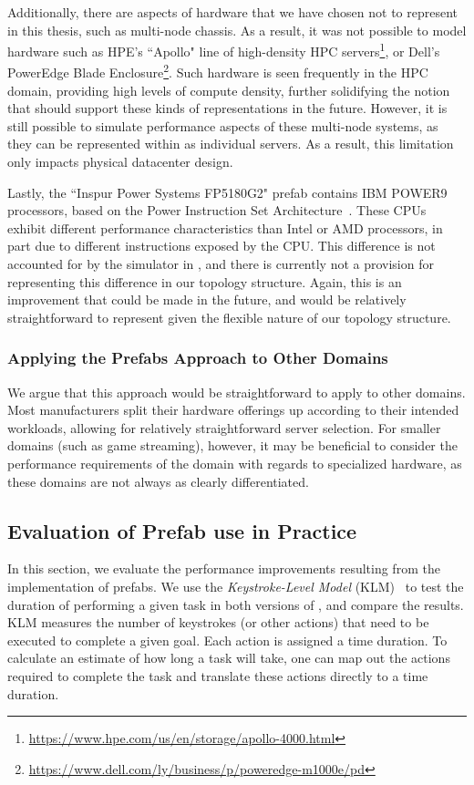 \documentclass[11pt]{article}
\begin{document}
			Additionally, there are aspects of hardware that we have chosen not to represent in this thesis, such as multi-node chassis.
			As a result, it was not possible to model hardware such as HPE's ``Apollo" line of high-density HPC servers\footnote{\url{https://www.hpe.com/us/en/storage/apollo-4000.html}}, or Dell's PowerEdge Blade Enclosure\footnote{\url{https://www.dell.com/ly/business/p/poweredge-m1000e/pd}}.
			Such hardware is seen frequently in the HPC domain, providing high levels of compute density, further solidifying the notion that \opendc{} should support these kinds of representations in the future.
			However, it is still possible to simulate performance aspects of these multi-node systems, as they can be represented within \opendc{} as individual servers.
			As a result, this limitation only impacts physical datacenter design.

			Lastly, the ``Inspur Power Systems FP5180G2" prefab contains IBM POWER9 processors, based on the Power Instruction Set Architecture~\cite{IBM2017}.
			These CPUs exhibit different performance characteristics than Intel or AMD processors, in part due to different instructions exposed by the CPU.
			This difference is not accounted for by the simulator in \opendc{}, and there is currently not a provision for representing this difference in our topology structure.
			Again, this is an improvement that could be made in the future, and would be relatively straightforward to represent given the flexible nature of our topology structure.


		\subsubsection{Applying the Prefabs Approach to Other Domains}
			We argue that this approach would be straightforward to apply to other domains.
			Most manufacturers split their hardware offerings up according to their intended workloads, allowing for relatively straightforward server selection.
			For smaller domains (such as game streaming), however, it may be beneficial to consider the performance requirements of the domain with regards to specialized hardware, as these domains are not always as clearly differentiated.

	\subsection{Evaluation of Prefab use in Practice}
		In this section, we evaluate the performance improvements resulting from the implementation of prefabs.
		We use the \textit{Keystroke-Level Model} (KLM)~\cite{Newell1980} to test the duration of performing a given task in both versions of \opendc{}, and compare the results.
		KLM measures the number of keystrokes (or other actions) that need to be executed to complete a given goal. 
		Each action is assigned a time duration.
		To calculate an estimate of how long a task will take, one can map out the actions required to complete the task and translate these actions directly to a time duration.
\end{document}
